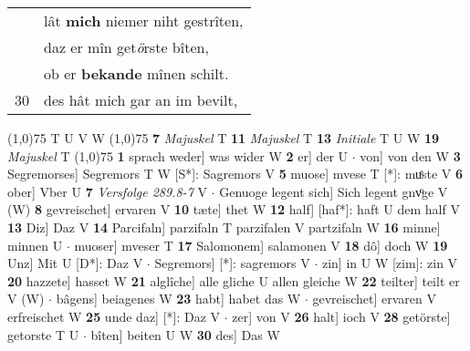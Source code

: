 \documentclass[8pt,a4paper,notitlepage]{article}
\begin{document}
\begin{table}[ht]
\begin{minipage}[t]{0.5\linewidth}
\begin{tabular}{rl}
 & lât \textbf{mich} niemer niht gestrîten,\\ 
 & daz er mîn get\textit{ö}rste bîten,\\ 
 & ob er \textbf{bekande} mînen schilt.\\ 
30 & des hât mich gar an im bevilt,\\ 
\end{tabular}
\scriptsize
\line(1,0){75} \newline
T U V W \newline
\line(1,0){75} \newline
\textbf{7} \textit{Majuskel} T  \textbf{11} \textit{Majuskel} T  \textbf{13} \textit{Initiale} T U W  \textbf{19} \textit{Majuskel} T  \newline
\line(1,0){75} \newline
\textbf{1} sprach weder] was wider W \textbf{2} er] der U  $\cdot$ von] von den W \textbf{3} Segremorses] Segremors T W [S*]: Sagremors V \textbf{5} muose] mvese T [*]: muͤste V \textbf{6} ober] Vber U \textbf{7} \textit{Versfolge 289.8-7} V   $\cdot$ Genuoge legent sich] Sich legent gnvͦge V (W) \textbf{8} gevreischet] ervaren V \textbf{10} tæte] thet W \textbf{12} half] [haf*]: haft U dem half V \textbf{13} Diz] Daz V \textbf{14} Parcifaln] parzifaln T parzifalen V partzifaln W \textbf{16} minne] minnen U  $\cdot$ muoser] mveser T \textbf{17} Salomonem] salamonen V \textbf{18} dô] doch W \textbf{19} Unz] Mit U [D*]: Daz V  $\cdot$ Segremors] [*]: sagremors V  $\cdot$ zin] in U W [zim]: zin V \textbf{20} hazzete] hasset W \textbf{21} alglîche] alle gliche U allen gleiche W \textbf{22} teilter] teilt er V (W)  $\cdot$ bâgens] beiagenes W \textbf{23} habt] habet das W  $\cdot$ gevreischet] ervaren V erfreischet W \textbf{25} unde daz] [*]: Daz V  $\cdot$ zer] von V \textbf{26} halt] ioch V \textbf{28} getörste] getorste T U  $\cdot$ bîten] beiten U W \textbf{30} des] Das W \newline
\end{minipage}
\end{table}
\end{document}
